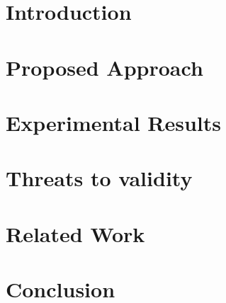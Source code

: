 	\author{
	}
	
	\maketitle	

	\begin{abstract}
		\label{sec:abstract}
		
	\end{abstract}


\section{Introduction}
\label{sec:introduction}




\section{Proposed Approach}
\label{sec:framework}


\section{Experimental Results}
\label{sec:exp_results}


\section{Threats to validity}
\label{sec:threats}



\section{Related Work}
\label{sec:relatedwork}


\section{Conclusion}
\label{sec:conclusion}


%

%

\balance

\let\oldthebibliography=\thebibliography
\let\endoldthebibliography=\endthebibliography
\renewenvironment{thebibliography}[1]{%
	\vspace{0pt}
	\begin{oldthebibliography}{#1}%
		\fontsize{7.0}{7.5}\selectfont
		\setlength{\parskip}{0ex}%
		\setlength{\itemsep}{0.5ex}%
	}%
	{%
	\end{oldthebibliography}%
}
{\scriptsize
	\def\baselinestretch{0.95}
	
	
}

